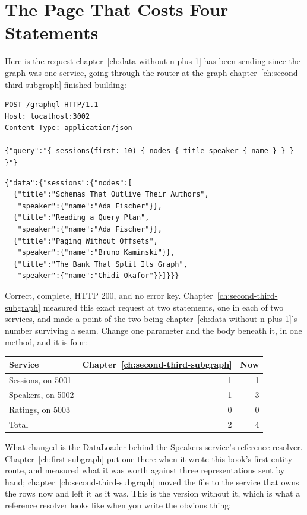 \section{The Page That Costs Four Statements}
\label{sec:ch10-the-page-that-costs-four}

%
Here is the request chapter~\ref{ch:data-without-n-plus-1} has been sending
since the graph was one service, going through the router at the graph
chapter~\ref{ch:second-third-subgraph} finished building:

\begin{verbatim}
POST /graphql HTTP/1.1
Host: localhost:3002
Content-Type: application/json

{"query":"{ sessions(first: 10) { nodes { title speaker { name } } } }"}
\end{verbatim}

\begin{verbatim}
{"data":{"sessions":{"nodes":[
  {"title":"Schemas That Outlive Their Authors",
   "speaker":{"name":"Ada Fischer"}},
  {"title":"Reading a Query Plan",
   "speaker":{"name":"Ada Fischer"}},
  {"title":"Paging Without Offsets",
   "speaker":{"name":"Bruno Kaminski"}},
  {"title":"The Bank That Split Its Graph",
   "speaker":{"name":"Chidi Okafor"}}]}}}
\end{verbatim}

%
Correct, complete, HTTP 200, and no error key.
Chapter~\ref{ch:second-third-subgraph} measured this exact request at two
statements, one in each of two services, and made a point of the two being
chapter~\ref{ch:data-without-n-plus-1}'s number surviving a seam. Change one
parameter and the body beneath it, in one method, and it is four:

\begin{center}
\begin{tabular}{lrr}
\toprule
Service & Chapter~\ref{ch:second-third-subgraph} & Now \\
\midrule
Sessions, on 5001 & 1 & 1 \\
Speakers, on 5002 & 1 & 3 \\
Ratings, on 5003 & 0 & 0 \\
\midrule
Total & 2 & 4 \\
\bottomrule
\end{tabular}
\end{center}

%
What changed is the DataLoader behind the Speakers service's reference
resolver. Chapter~\ref{ch:first-subgraph} put one there when it wrote this
book's first entity route, and measured what it was worth against three
representations sent by hand;
chapter~\ref{ch:second-third-subgraph} moved the file to the service that owns
the rows now and left it as it was. This is the version without it, which is
what a reference resolver looks like when you write the obvious thing:

